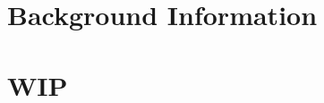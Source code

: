 \documentclass{newrucsthesis}
\begin{document}


\tableofcontents
\printglossaries


%

\chapter{Background Information}






\chapter{WIP}








\end{document}
